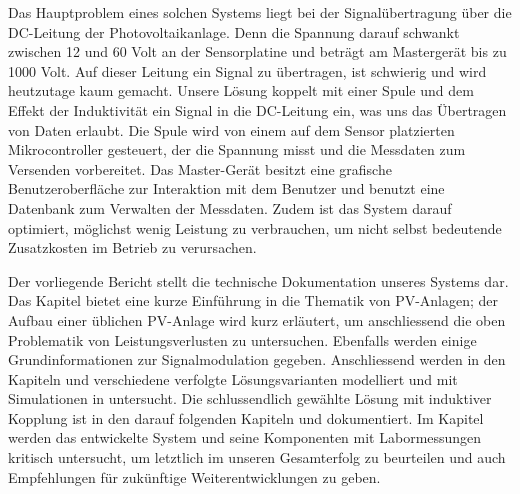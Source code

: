 Das  Hauptproblem  eines solchen  Systems  liegt  bei der  Signal\"ubertragung
\"uber  die  DC-Leitung  der   Photovoltaikanlage. Denn  die  Spannung  darauf
schwankt  zwischen 12  und  60  Volt an  der  Sensorplatine  und betr\"agt  am
Masterger\"at bis zu 1000 Volt. Auf dieser Leitung ein Signal zu \"ubertragen,
ist schwierig  und wird heutzutage  kaum gemacht. Unsere L\"osung  koppelt mit
einer Spule  und dem Effekt  der Induktivit\"at  ein Signal in  die DC-Leitung
ein, was uns das \"Ubertragen von  Daten erlaubt. Die Spule wird von einem auf
dem  Sensor  platzierten Mikrocontroller  gesteuert,  der  die Spannung  misst
und  die  Messdaten  zum  Versenden  vorbereitet. Das  Master-Ger\"at  besitzt
eine  grafische  Benutzeroberfl\"ache zur  Interaktion  mit  dem Benutzer  und
benutzt  eine Datenbank  zum Verwalten  der Messdaten.   Zudem ist  das System
darauf optimiert, m\"oglichst  wenig Leistung zu verbrauchen,  um nicht selbst
bedeutende Zusatzkosten im Betrieb zu verursachen.

Der   vorliegende  Bericht   stellt  die   technische  Dokumentation   unseres
Systems   dar. Das   Kapitel  \emph{}   bietet   eine
kurze  Einf\"uhrung  in   die  Thematik  von  PV-Anlagen;   der  Aufbau  einer
\"ublichen  PV-Anlage  wird  kurz   erl\"autert,  um  anschliessend  die  oben
Problematik  von Leistungsverlusten  zu  untersuchen. Ebenfalls werden  einige
Grundinformationen  zur  Signalmodulation  gegeben.  Anschliessend  werden  in
den  Kapiteln  \emph{}  und  \emph{}
verschiedene     verfolgte    L\"osungsvarianten     modelliert    und     mit
Simulationen  in     untersucht. Die  schlussendlich  gew\"ahlte
L\"osung   mit    induktiver   Kopplung   ist   in    den   darauf   folgenden
Kapiteln  \emph{} und  \emph{}
dokumentiert.   Im   Kapitel  \emph{}   werden  das
entwickelte  System   und  seine   Komponenten  mit   Labormessungen  kritisch
untersucht, um letztlich  im \emph{} unseren Gesamterfolg
zu beurteilen und auch  Empfehlungen f\"ur zuk\"unftige Weiterentwicklungen zu
geben.

